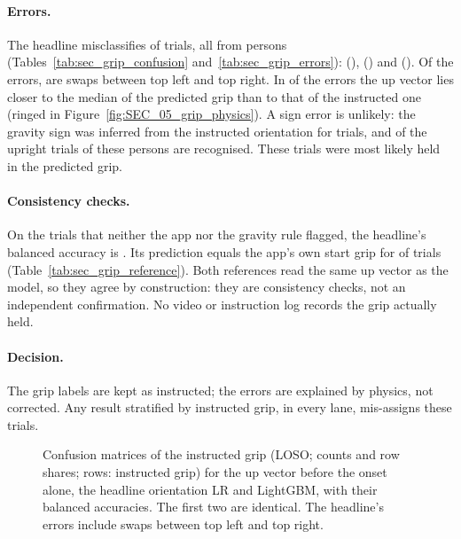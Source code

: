 \paragraph{Errors.} The headline misclassifies  of  trials, all from
 persons (Tables~\ref{tab:sec_grip_confusion} and~\ref{tab:sec_grip_errors}):
 (),  () and
 (). Of the errors,  are swaps
between top left and top right. In  of the  errors
the up vector lies closer to the median of the predicted grip than to that of the instructed one (ringed in
Figure~\ref{fig:SEC_05_grip_physics}). A sign error is unlikely: the gravity sign was inferred from the instructed
orientation for  trials, and  of the
 upright trials of these persons are recognised. These trials were most likely held in
the predicted grip.

\paragraph{Consistency checks.} On the  trials that neither the app nor the gravity
rule flagged, the headline's balanced accuracy is . Its prediction equals the
app's own start grip for  of  trials
(Table~\ref{tab:sec_grip_reference}). Both references read the same up vector as the model, so they agree by
construction: they are consistency checks, not an independent confirmation. No video or instruction log records
the grip actually held.

\paragraph{Decision.} The grip labels are kept as instructed; the errors are explained by physics, not corrected.
Any result stratified by instructed grip, in every lane, mis-assigns these  trials.

\begin{figure}[tbp]
\centering
{}
\caption{Confusion matrices of the instructed grip (LOSO; counts and row shares; rows: instructed grip) for the
up vector before the onset alone, the headline orientation LR and LightGBM, with their balanced accuracies. The
first two are identical. The headline's  errors include 
swaps between top left and top right.}
\label{fig:SEC_04_grip_confusion}\label{fig:app:sec-grip-confusion}
\end{figure}


